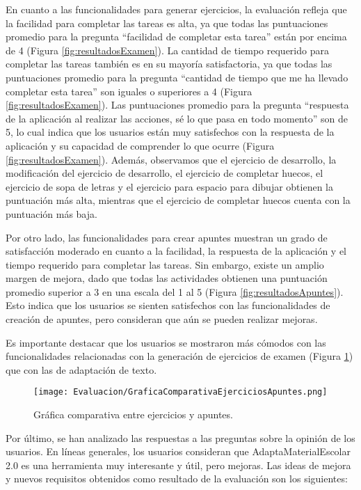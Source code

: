 En cuanto a las funcionalidades para generar ejercicios, la evaluación refleja que la facilidad para completar las tareas es alta, ya que todas las puntuaciones promedio para la pregunta ``facilidad de completar esta tarea'' están por encima de 4 (Figura \ref{fig:resultadosExamen}). La cantidad de tiempo requerido para completar las tareas también es en su mayoría satisfactoria, ya que todas las puntuaciones promedio para la pregunta ``cantidad de tiempo que me ha llevado completar esta tarea'' son iguales o superiores a 4 (Figura \ref{fig:resultadosExamen}). Las puntuaciones promedio para la pregunta ``respuesta de la aplicación al realizar las acciones, sé lo que pasa en todo momento'' son de 5, lo cual indica que los usuarios están muy satisfechos con la respuesta de la aplicación y su capacidad de comprender lo que ocurre (Figura \ref{fig:resultadosExamen}). Además, observamos que el ejercicio de desarrollo, la modificación del ejercicio de desarrollo, el ejercicio de completar huecos, el ejercicio de sopa de letras y el ejercicio para espacio para dibujar obtienen la puntuación más alta, mientras que el ejercicio de completar huecos cuenta con la puntuación más baja.

Por otro lado, las funcionalidades para crear apuntes muestran un grado de satisfacción moderado en cuanto a la facilidad, la respuesta de la aplicación y el tiempo requerido para completar las tareas. Sin embargo, existe un amplio margen de mejora, dado que todas las actividades obtienen una puntuación promedio superior a 3 en una escala del 1 al 5 (Figura \ref{fig:resultadosApuntes}). Esto indica que los usuarios se sienten satisfechos con las funcionalidades de creación de apuntes, pero consideran que aún se pueden realizar mejoras.

Es importante destacar que los usuarios se mostraron más cómodos con las funcionalidades relacionadas con la generación de ejercicios de examen (Figura \ref{fig:graficaComparativaEjerciciosApuntes}) que con las de adaptación de texto.

\begin{figure}[ht!]
    \centering
    \texttt{[image: Evaluacion/GraficaComparativaEjerciciosApuntes.png]}
    \caption{Gráfica comparativa entre ejercicios y apuntes.}
    \label{fig:graficaComparativaEjerciciosApuntes}
\end{figure}

Por último, se han analizado las respuestas a las preguntas sobre la opinión de los usuarios. En líneas generales, los usuarios consideran que AdaptaMaterialEscolar 2.0 es una herramienta muy interesante y útil, pero mejoras. Las ideas de mejora y nuevos requisitos obtenidos como resultado de la evaluación son los siguientes:

